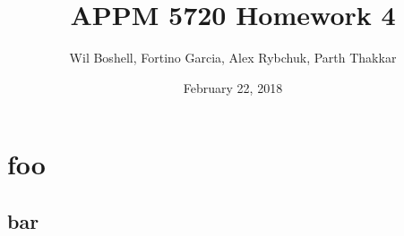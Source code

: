 \documentclass{article}
\title{APPM 5720 Homework 4}
\author{Wil Boshell, Fortino Garcia, Alex Rybchuk, Parth Thakkar}
\date{February 22, 2018}
\begin{document}
\maketitle

\maketitle

\section{foo}

\subsection{bar}
\end{document}
